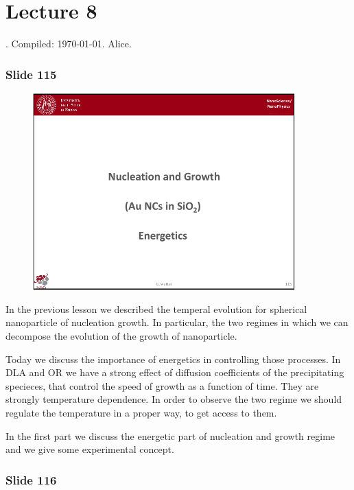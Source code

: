 \documentclass[../main/main.tex]{subfiles}
\begin{document}
\section{Lecture 8}
 . Compiled:  \today. Alice.

\subsubsection{Slide 115}

\begin{figure}[h!]
\centering
\includegraphics[page=1,width=0.9\textwidth]{../lessons/pdf_file/8_lesson.pdf}
\end{figure}

In the previous lesson we described the temperal evolution for spherical nanoparticle of nucleation growth. In particular, the two regimes in which we can decompose the evolution of the growth of nanoparticle.

Today we discuss the importance of energetics in controlling those processes. In DLA and OR we have a strong effect of diffusion coefficients of the precipitating specieces, that control the speed of growth as a function of time. They are strongly temperature dependence. In order to observe the two regime we should regulate the temperature in a proper way, to get access to them.

In the first part we discuss the energetic part of nucleation and growth regime and we give some experimental concept.

\newpage

\subsubsection{Slide 116}
\end{document}
